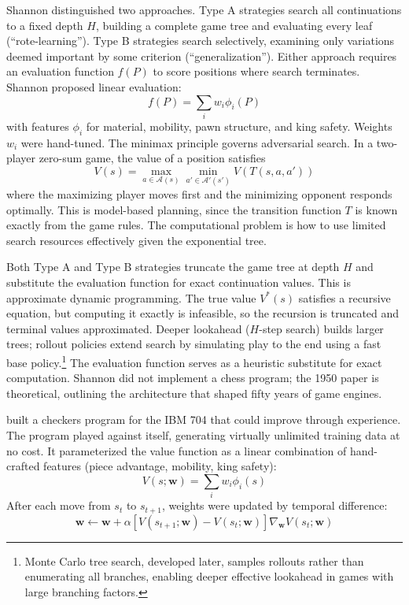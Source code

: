 Shannon distinguished two approaches. Type A strategies search all continuations to a fixed depth $H$, building a complete game tree and evaluating every leaf (``rote-learning''). Type B strategies search selectively, examining only variations deemed important by some criterion (``generalization''). Either approach requires an evaluation function $f(P)$ to score positions where search terminates. Shannon proposed linear evaluation:
\begin{equation}
f(P) = \sum_i w_i \phi_i(P)
\end{equation}
with features $\phi_i$ for material, mobility, pawn structure, and king safety. Weights $w_i$ were hand-tuned. The minimax principle governs adversarial search. In a two-player zero-sum game, the value of a position satisfies
\begin{equation}
V(s) = \max_{a \in \mathcal{A}(s)} \min_{a' \in \mathcal{A}'(s')} V(T(s, a, a'))
\end{equation}
where the maximizing player moves first and the minimizing opponent responds optimally. This is model-based planning, since the transition function $T$ is known exactly from the game rules. The computational problem is how to use limited search resources effectively given the exponential tree.

Both Type A and Type B strategies truncate the game tree at depth $H$ and substitute the evaluation function for exact continuation values. This is approximate dynamic programming. The true value $V^*(s)$ satisfies a recursive equation, but computing it exactly is infeasible, so the recursion is truncated and terminal values approximated. Deeper lookahead ($H$-step search) builds larger trees; rollout policies extend search by simulating play to the end using a fast base policy.\footnote{Monte Carlo tree search, developed later, samples rollouts rather than enumerating all branches, enabling deeper effective lookahead in games with large branching factors.} The evaluation function serves as a heuristic substitute for exact computation. Shannon did not implement a chess program; the 1950 paper is theoretical, outlining the architecture that shaped fifty years of game engines.

\citet{Samuel1959} built a checkers program for the IBM 704 that could improve through experience. The program played against itself, generating virtually unlimited training data at no cost. It parameterized the value function as a linear combination of hand-crafted features (piece advantage, mobility, king safety):
\begin{equation}
V(s; \mathbf{w}) = \sum_{i} w_i \phi_i(s)
\end{equation}
After each move from $s_t$ to $s_{t+1}$, weights were updated by temporal difference:
\begin{equation}
\mathbf{w} \leftarrow \mathbf{w} + \alpha \left[ V(s_{t+1}; \mathbf{w}) - V(s_t; \mathbf{w}) \right] \nabla_{\mathbf{w}} V(s_t; \mathbf{w})
\end{equation}

